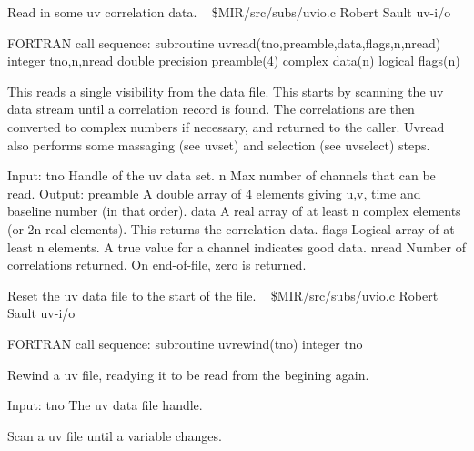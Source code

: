 %
\noindent Read in some uv correlation data.
\newline \ 
\newline {} \$MIR/src/subs/uvio.c
\newline {} Robert Sault
\newline {} uv-i/o
\par{\tenpoint
{\eightpoint\begintt
FORTRAN call sequence:
        subroutine uvread(tno,preamble,data,flags,n,nread)
        integer tno,n,nread
        double precision preamble(4)
        complex data(n)
        logical flags(n)

  This reads a single visibility from the data file. This starts by scanning
  the uv data stream until a correlation record is found. The correlations
  are then converted to complex numbers if necessary, and returned to the
  caller. Uvread also performs some massaging (see uvset) and selection
  (see uvselect) steps.

  Input:
    tno         Handle of the uv data set.
    n           Max number of channels that can be read.
  Output:
    preamble    A double array of 4 elements giving u,v, time and
                baseline number (in that order).
    data        A real array of at least n complex elements (or 2n real
                elements). This returns the correlation data.
    flags       Logical array of at least n elements. A true value for
                a channel indicates good data.
    nread       Number of correlations returned. On end-of-file, zero
                is returned.                                            
\endtt}
\par}
%
\noindent Reset the uv data file to the start of the file.
\newline \ 
\newline {} \$MIR/src/subs/uvio.c
\newline {} Robert Sault
\newline \abox{Keywords:} uv-i/o
\par{\tenpoint
{\eightpoint\begintt
FORTRAN call sequence:
        subroutine uvrewind(tno)
        integer tno

  Rewind a uv file, readying it to be read from the begining again.

  Input:
    tno         The uv data file handle.                                
\endtt}
\par}
%
\noindent Scan a uv file until a variable changes.
\newline \ 
